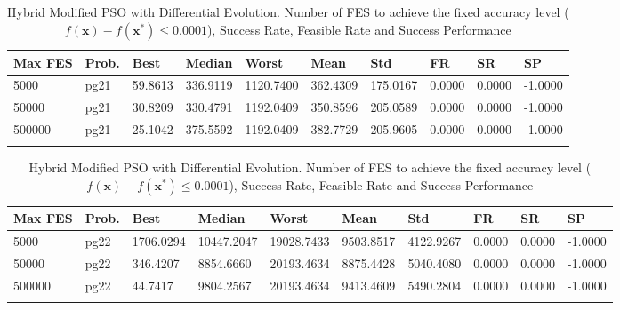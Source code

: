 \documentclass[10pt, a4paper]{book}
\begin{document}
\begin{center}
\begin{longtable}{l l l l l l l l l l}
\textbf{Max FES} & \textbf{Prob.} & \textbf{Best} & \textbf{Median} & \textbf{Worst} & \textbf{Mean} & \textbf{Std} & \textbf{FR} & \textbf{SR} & \textbf{SP} \\
\hline
5000 & pg21 & 59.8613 & 336.9119 & 1120.7400 & 362.4309 & 175.0167 & 0.0000 & 0.0000 & -1.0000 \\
50000 & pg21 & 30.8209 & 330.4791 & 1192.0409 & 350.8596 & 205.0589 & 0.0000 & 0.0000 & -1.0000 \\
500000 & pg21 & 25.1042 & 375.5592 & 1192.0409 & 382.7729 & 205.9605 & 0.0000 & 0.0000 & -1.0000 \\

\caption{ Hybrid Modified PSO with Differential Evolution. Number of FES to achieve the fixed accuracy level ($f(\mathbf{x}) - f(\mathbf{x}^{*}) \leq 0.0001$), Success Rate, Feasible Rate and Success Performance }
\end{longtable}
\end{center}

\begin{center}
\begin{longtable}{l l l l l l l l l l}
\textbf{Max FES} & \textbf{Prob.} & \textbf{Best} & \textbf{Median} & \textbf{Worst} & \textbf{Mean} & \textbf{Std} & \textbf{FR} & \textbf{SR} & \textbf{SP} \\
\hline
5000 & pg22 & 1706.0294 & 10447.2047 & 19028.7433 & 9503.8517 & 4122.9267 & 0.0000 & 0.0000 & -1.0000 \\
50000 & pg22 & 346.4207 & 8854.6660 & 20193.4634 & 8875.4428 & 5040.4080 & 0.0000 & 0.0000 & -1.0000 \\
500000 & pg22 & 44.7417 & 9804.2567 & 20193.4634 & 9413.4609 & 5490.2804 & 0.0000 & 0.0000 & -1.0000 \\

\caption{ Hybrid Modified PSO with Differential Evolution. Number of FES to achieve the fixed accuracy level ($f(\mathbf{x}) - f(\mathbf{x}^{*}) \leq 0.0001$), Success Rate, Feasible Rate and Success Performance }
\end{longtable}
\end{center}
\end{document}
